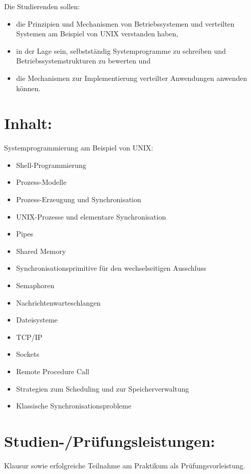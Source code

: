 Die Studierenden sollen:

\begin{itemize}
\tightlist
\item
  die Prinzipien und Mechanismen von Betriebssystemen und verteilten
  Systemen am Beispiel von UNIX verstanden haben,
\item
  in der Lage sein, selbstständig Systemprogramme zu schreiben und
  Betriebssystemstrukturen zu bewerten und
\item
  die Mechanismen zur Implementierung verteilter Anwendungen anwenden
  können.
\end{itemize}

\section*{Inhalt:}\label{inhalt-5}

Systemprogrammierung am Beispiel von UNIX:

\begin{itemize}
\tightlist
\item
  Shell-Programmierung
\item
  Prozess-Modelle
\item
  Prozess-Erzeugung und Synchronisation
\item
  UNIX-Prozesse und elementare Synchronisation
\item
  Pipes
\item
  Shared Memory
\item
  Synchronisationsprimitive für den wechselseitigen Ausschluss
\item
  Semaphoren
\item
  Nachrichtenwarteschlangen
\item
  Dateisysteme
\item
  TCP/IP
\item
  Sockets
\item
  Remote Procedure Call
\item
  Strategien zum Scheduling und zur Speicherverwaltung
\item
  Klassische Synchronisationsprobleme
\end{itemize}

\section*{Studien-/Prüfungsleistungen:}\label{studien-pruxfcfungsleistungen-4}

Klausur sowie erfolgreiche Teilnahme am Praktikum als
Prüfungsvorleistung.

